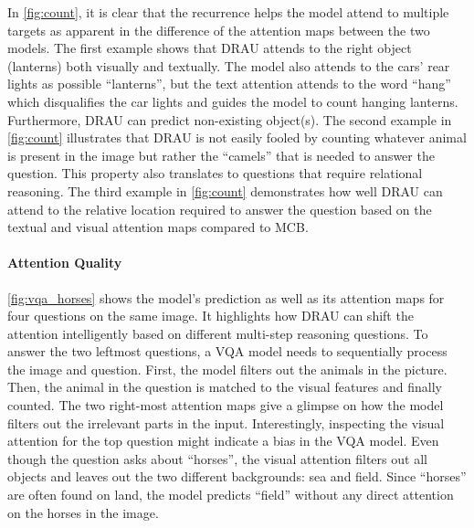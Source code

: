 \documentclass[times,twocolumn, final ,authoryear]{elsarticle}
\begin{document}
  
  In \cref{fig:count}, it is clear that the recurrence helps the model attend to multiple targets as apparent in the difference of the attention maps between the two models. The first example shows that \ac{DRAU} attends to the right object (lanterns) both visually and textually. The model also attends to the cars' rear lights as possible ``lanterns'', but the text attention attends to the word ``hang'' which disqualifies the car lights and guides the model to count hanging lanterns. Furthermore, DRAU can predict non-existing object(s). The second example in \cref{fig:count} illustrates that DRAU is not easily fooled by counting whatever animal is present in the image but rather the ``camels'' that is needed to answer the question. This property also translates to questions that require relational reasoning. The third example in \cref{fig:count} demonstrates how well DRAU can attend to the relative location required to answer the question based on the textual and visual attention maps compared to MCB.
  
  \vspace{-.76 mm}
  \paragraph{Attention Quality}\cref{fig:vqa_horses} shows the model's prediction as well as its attention maps for four questions on the same image. It highlights how DRAU can shift the attention intelligently based on different multi-step reasoning questions. To answer the two leftmost questions, a VQA model needs to sequentially process the image and question. First, the model filters out the animals in the picture. Then, the animal in the question is matched to the visual features and finally counted. The two right-most attention maps give a glimpse on how the model filters out the irrelevant parts in the input. Interestingly, inspecting the visual attention for the top question might indicate a bias in the VQA model. Even though the question asks about ``horses'', the visual attention filters out all objects and leaves out the two different backgrounds: sea and field. Since ``horses'' are often found on land, the model predicts ``field'' without any direct attention on the horses in the image.
  
\end{document}
